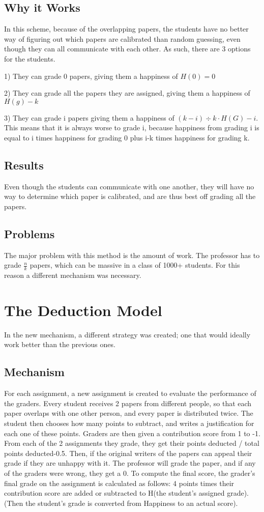 \documentclass[12pt, Arial]{article}
\begin{document}
\subsection{Why it Works}
In this scheme, because of the overlapping papers, the students have no better way of figuring out which papers are calibrated than random guessing, even though they can all communicate with each other. As such, there are 3 options for the students.

1) They can grade 0 papers, giving them a happiness of $H(0) = 0$

2) They can grade all the papers they are assigned, giving them a happiness of $H(g) - k$

3) They can grade i papers giving them a happiness of $(k-i)\div k \cdot H(G)-i$. This means that it is always worse to grade i, because happiness from grading i is equal to i times happiness for grading 0 plus i-k times happiness for grading k.

\subsection{Results}
Even though the students can communicate with one another, they will have no way to determine which paper is calibrated, and are thus best off grading all the papers.

\subsection{Problems}
The major problem with this method is the amount of work. The professor has to grade $\frac{n}{k}$ papers, which can be massive in a class of 1000+ students. For this reason a different mechanism was necessary.

\section{The Deduction Model}
In the new mechanism, a different strategy was created; one that would ideally work better than the previous ones.

\subsection{Mechanism}
For each assignment, a new assignment is created to evaluate the performance of the graders. Every student receives 2 papers from different people, so that each paper overlaps with one other person, and every paper is distributed twice. The student then chooses how many points to subtract, and writes a justification for each one of these points. Graders are then given a contribution score from 1 to -1. From each of the 2 assignments they grade, they get their points deducted / total points deducted-0.5. Then, if the original writers of the papers can appeal their grade if they are unhappy with it. The professor will grade the paper, and if any of the graders were wrong, they get a 0. To compute the final score, the grader's final grade on the assignment is calculated as follows: 4 points times their contribution score are added or subtracted to H(the student's assigned grade). (Then the student's grade is converted from Happiness to an actual score).
\end{document}
